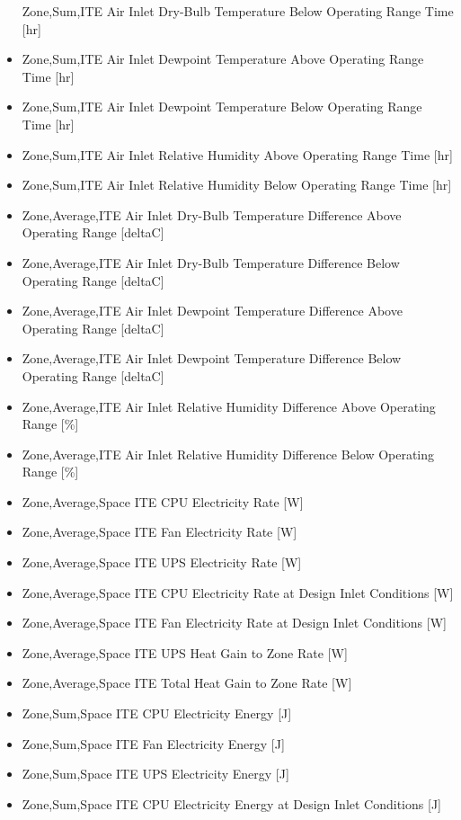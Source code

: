 \begin{itemize}
  Zone,Sum,ITE Air Inlet Dry-Bulb Temperature Below Operating Range Time {[}hr{]}
\item
  Zone,Sum,ITE Air Inlet Dewpoint Temperature Above Operating Range Time {[}hr{]}
\item
  Zone,Sum,ITE Air Inlet Dewpoint Temperature Below Operating Range Time {[}hr{]}
\item
  Zone,Sum,ITE Air Inlet Relative Humidity Above Operating Range Time {[}hr{]}
\item
  Zone,Sum,ITE Air Inlet Relative Humidity Below Operating Range Time {[}hr{]}
\item
  Zone,Average,ITE Air Inlet Dry-Bulb Temperature Difference Above Operating Range {[}deltaC{]}
\item
  Zone,Average,ITE Air Inlet Dry-Bulb Temperature Difference Below Operating Range {[}deltaC{]}
\item
  Zone,Average,ITE Air Inlet Dewpoint Temperature Difference Above Operating Range {[}deltaC{]}
\item
  Zone,Average,ITE Air Inlet Dewpoint Temperature Difference Below Operating Range {[}deltaC{]}
\item
  Zone,Average,ITE Air Inlet Relative Humidity Difference Above Operating Range {[}\%{]}
\item
  Zone,Average,ITE Air Inlet Relative Humidity Difference Below Operating Range {[}\%{]}
\item
  Zone,Average,Space ITE CPU Electricity Rate {[}W{]}
\item
  Zone,Average,Space ITE Fan Electricity Rate {[}W{]}
\item
  Zone,Average,Space ITE UPS Electricity Rate {[}W{]}
\item
  Zone,Average,Space ITE CPU Electricity Rate at Design Inlet Conditions {[}W{]}
\item
  Zone,Average,Space ITE Fan Electricity Rate at Design Inlet Conditions {[}W{]}
\item
  Zone,Average,Space ITE UPS Heat Gain to Zone Rate {[}W{]}
\item
  Zone,Average,Space ITE Total Heat Gain to Zone Rate {[}W{]}
\item
  Zone,Sum,Space ITE CPU Electricity Energy {[}J{]}
\item
  Zone,Sum,Space ITE Fan Electricity Energy {[}J{]}
\item
  Zone,Sum,Space ITE UPS Electricity Energy {[}J{]}
\item
  Zone,Sum,Space ITE CPU Electricity Energy at Design Inlet Conditions {[}J{]}

\end{itemize}
